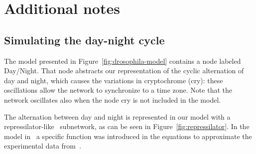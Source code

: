 \documentclass{bmcart}
\begin{document}
\clearpage
\section{Additional notes}

\subsection{Simulating the day-night cycle}\label{suppl:repressilator}
The model presented in Figure~\ref{fig:drosophila-model} contains a node
labeled {\sf Day/Night}. That node abstracts our representation
of the cyclic alternation of day and night, which causes the variations
in cryptochrome ({\sf cry}): these oscillations allow the network
to synchronize to a time zone. Note that the network oscillates
also when the node {\sf cry} is not included in the model.

The alternation between day and night is represented in our model with a
repressilator-like~\cite{repressilator} subnetwork, as can be seen in Figure~\ref{fig:repressilator}.
In the model in~\cite{drosophila-ode-model} a specific function
was introduced in the equations to approximate the experimental data from~\cite{drosophila-cry-data}.
\end{document}
